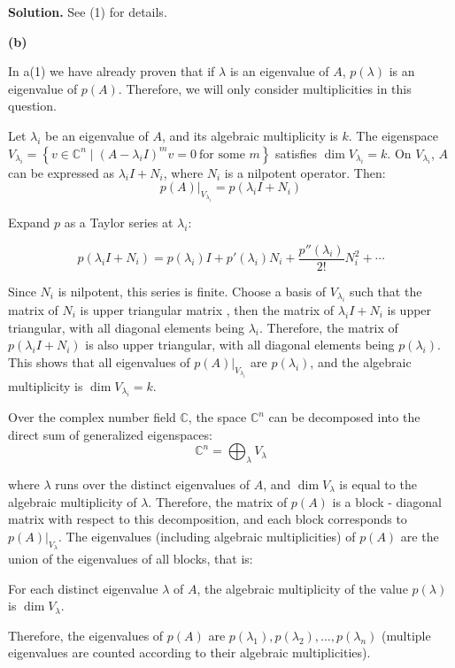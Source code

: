 \documentclass[12pt, a4paper, oneside]{ctexart}
\newenvironment{solution}{\par\noindent\textbf{Solution. }}{\par}
\begin{document}
\begin{solution}
See (1) for details.

\vspace{12pt}
	
\textbf{(b)}

In a(1) we have already proven that if $ \lambda $ is an eigenvalue of $ A $, $ p(\lambda) $ is an eigenvalue of $ p(A) $. Therefore, we will only consider multiplicities in this question.

Let $ \lambda_i $ be an eigenvalue of $ A $, and its algebraic multiplicity is $ k $. The eigenspace $ V_{\lambda_i}=\left\{v\in\mathbb{C}^n\mid (A - \lambda_i I)^m v = 0\ \text{for some }m\right\} $ satisfies $ \dim V_{\lambda_i}=k $. On $ V_{\lambda_i} $, $ A $ can be expressed as $ \lambda_i I + N_i $, where $ N_i $ is a nilpotent operator. Then:
$$
\left.p(A)\right|_{V_{\lambda_i}}=p(\lambda_i I + N_i) 
$$

Expand $ p $ as a Taylor series at $ \lambda_i $:

$$ p(\lambda_i I + N_i)=p(\lambda_i)I + p'(\lambda_i)N_i+\frac{p''(\lambda_i)}{2!}N_i^2+\cdots $$

Since $ N_i $ is nilpotent, this series is finite. Choose a basis of $ V_{\lambda_i} $ such that the matrix of $ N_i $ is upper triangular matrix , then the matrix of $ \lambda_i I + N_i $ is upper triangular, with all diagonal elements being $ \lambda_i $. Therefore, the matrix of $ p(\lambda_i I + N_i) $ is also upper triangular, with all diagonal elements being $ p(\lambda_i) $. This shows that all eigenvalues of $ \left.p(A)\right|_{V_{\lambda_i}} $ are $ p(\lambda_i) $, and the algebraic multiplicity is $ \dim V_{\lambda_i}=k $.

Over the complex number field $ \mathbb{C} $, the space $ \mathbb{C}^n $ can be decomposed into the direct sum of generalized eigenspaces:
$$
\mathbb{C}^n=\bigoplus_{\lambda}V_{\lambda} 
$$

where $ \lambda $ runs over the distinct eigenvalues of $ A $, and $ \dim V_{\lambda} $ is equal to the algebraic multiplicity of $ \lambda $. Therefore, the matrix of $ p(A) $ is a block - diagonal matrix with respect to this decomposition, and each block corresponds to $ \left.p(A)\right|_{V_{\lambda}} $. The eigenvalues (including algebraic multiplicities) of $ p(A) $ are the union of the eigenvalues of all blocks, that is:

For each distinct eigenvalue $ \lambda $ of $ A $, the algebraic multiplicity of the value $ p(\lambda) $ is $ \dim V_{\lambda} $.

Therefore, the eigenvalues of $ p(A) $ are $ p(\lambda_1),p(\lambda_2),\ldots,p(\lambda_n) $ (multiple eigenvalues are counted according to their algebraic multiplicities).

\end{solution}
\end{document}
